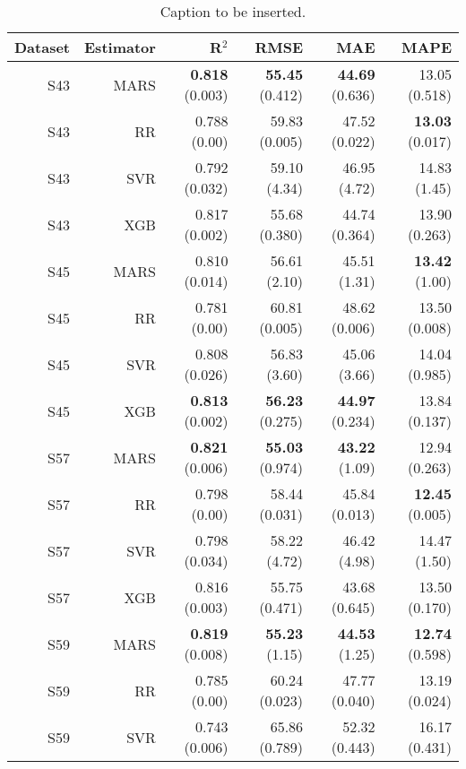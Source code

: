 \begin{table}
\centering
\caption{Caption to be inserted.}
\label{eml___comparison_datasets_table}
\begin{tabular}{rrrrrr}
\toprule
Dataset & Estimator &                R$^2$ &                 RMSE &                  MAE &                 MAPE \\
\midrule
    S43 &      MARS & { \bf 0.818} (0.003) & { \bf 55.45} (0.412) & { \bf 44.69} (0.636) &        13.05 (0.518) \\
    S43 &        RR &         0.788 (0.00) &        59.83 (0.005) &        47.52 (0.022) & { \bf 13.03} (0.017) \\
    S43 &       SVR &        0.792 (0.032) &         59.10 (4.34) &         46.95 (4.72) &         14.83 (1.45) \\
    S43 &       XGB &        0.817 (0.002) &        55.68 (0.380) &        44.74 (0.364) &        13.90 (0.263) \\
    S45 &      MARS &        0.810 (0.014) &         56.61 (2.10) &         45.51 (1.31) &  { \bf 13.42} (1.00) \\
    S45 &        RR &         0.781 (0.00) &        60.81 (0.005) &        48.62 (0.006) &        13.50 (0.008) \\
    S45 &       SVR &        0.808 (0.026) &         56.83 (3.60) &         45.06 (3.66) &        14.04 (0.985) \\
    S45 &       XGB & { \bf 0.813} (0.002) & { \bf 56.23} (0.275) & { \bf 44.97} (0.234) &        13.84 (0.137) \\
    S57 &      MARS & { \bf 0.821} (0.006) & { \bf 55.03} (0.974) &  { \bf 43.22} (1.09) &        12.94 (0.263) \\
    S57 &        RR &         0.798 (0.00) &        58.44 (0.031) &        45.84 (0.013) & { \bf 12.45} (0.005) \\
    S57 &       SVR &        0.798 (0.034) &         58.22 (4.72) &         46.42 (4.98) &         14.47 (1.50) \\
    S57 &       XGB &        0.816 (0.003) &        55.75 (0.471) &        43.68 (0.645) &        13.50 (0.170) \\
    S59 &      MARS & { \bf 0.819} (0.008) &  { \bf 55.23} (1.15) &  { \bf 44.53} (1.25) & { \bf 12.74} (0.598) \\
    S59 &        RR &         0.785 (0.00) &        60.24 (0.023) &        47.77 (0.040) &        13.19 (0.024) \\
    S59 &       SVR &        0.743 (0.006) &        65.86 (0.789) &        52.32 (0.443) &        16.17 (0.431) \\

\end{tabular}
\end{table}
